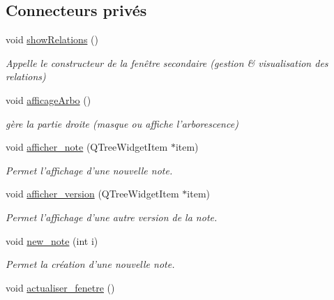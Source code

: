 \subsection*{Connecteurs privés}
\begin{DoxyCompactItemize}
\item 
\hypertarget{class_vue_principale_a242a1a9732b6c7997fa5998c25678a81}{void \hyperlink{class_vue_principale_a242a1a9732b6c7997fa5998c25678a81}{show\-Relations} ()}\label{class_vue_principale_a242a1a9732b6c7997fa5998c25678a81}

\begin{DoxyCompactList}\small\item\em Appelle le constructeur de la fenêtre secondaire (gestion \& visualisation des relations) \end{DoxyCompactList}\item 
\hypertarget{class_vue_principale_a726c780ade730bd88e15cfc6e63bb6a4}{void \hyperlink{class_vue_principale_a726c780ade730bd88e15cfc6e63bb6a4}{afficage\-Arbo} ()}\label{class_vue_principale_a726c780ade730bd88e15cfc6e63bb6a4}

\begin{DoxyCompactList}\small\item\em gère la partie droite (masque ou affiche l'arborescence) \end{DoxyCompactList}\item 
void \hyperlink{class_vue_principale_a487dbd07f0f5f81327606cc8c5235cef}{afficher\-\_\-note} (Q\-Tree\-Widget\-Item $\ast$item)
\begin{DoxyCompactList}\small\item\em Permet l'affichage d'une nouvelle note. \end{DoxyCompactList}\item 
void \hyperlink{class_vue_principale_ad72391d3e8bc1f37cd664657570c6518}{afficher\-\_\-version} (Q\-Tree\-Widget\-Item $\ast$item)
\begin{DoxyCompactList}\small\item\em Permet l'affichage d'une autre version de la note. \end{DoxyCompactList}\item 
void \hyperlink{class_vue_principale_a61cad396c2c3ed664bb8b45cfdd2e188}{new\-\_\-note} (int i)
\begin{DoxyCompactList}\small\item\em Permet la création d'une nouvelle note. \end{DoxyCompactList}\item 
\hypertarget{class_vue_principale_a205e5f51dbbe6d0d648ec52e629d2e6c}{void \hyperlink{class_vue_principale_a205e5f51dbbe6d0d648ec52e629d2e6c}{actualiser\-\_\-fenetre} ()}\label{class_vue_principale_a205e5f51dbbe6d0d648ec52e629d2e6c}


\end{DoxyCompactItemize}
